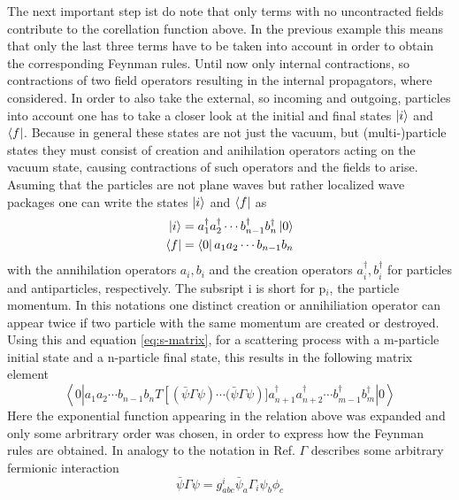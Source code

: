 The next important step ist do note that only terms with no uncontracted fields contribute to the corellation function above. In the previous example this means that only the last three terms have to be taken into account in order to obtain the corresponding Feynman rules. \newline
Until now only internal contractions, so contractions of two field operators resulting in the internal propagators, where considered. In order to also take the external, so incoming and outgoing, particles into account one has to take a closer look at the initial and final states $\ket{i}$ and $\bra{f}$. Because in general these states are not just the vacuum, but (multi-)particle states they must consist of creation and anihilation operators acting on the vacuum state, causing contractions of such operators and the fields to arise. Asuming that the particles are not plane waves but rather localized wave packages one can write the states $\ket{i}$ and $\bra{f}$ as\cite{Kopp:2016}
\begin{align*}
\ket{i}=a_1^\dagger a_2^\dagger \cdots b_{n-1}^\dagger b_n^\dagger \ket{0}
\\
\bra{f}=\bra{0}a_1 a_2 \cdots b_{n-1}b_n
\end{align*}
with the annihilation operators $a_i,b_i$ and the creation operators $a_i^\dagger,b_i^\dagger$ for particles and antiparticles, respectively. The subsript i is short for p$_i$, the particle momentum. In this notations one distinct creation or annihiliation operator can appear twice if two particle with the same momentum are created or destroyed. \newline
Using this and equation \ref{eq:s-matrix}, for a scattering process with a m-particle initial state and a n-particle final state, this results in the following matrix element \cite[Eq. 2.2]{Denner:1992vza}
\begin{equation}
\left<0\left|a_1 a_2 \cdots  b_{n-1} b_n T\left[\left(\bar{\psi}\Gamma\psi\right)\cdots(\bar{\psi}\Gamma\psi\right)]a_{n+1}^\dagger a_{n+2}^\dagger \cdots  b_{m-1}^\dagger b_m^\dagger\right|0\right>
\label{eq:matrix_element}
\end{equation}
Here the exponential function appearing in the relation above was expanded and only some arbritrary order was chosen, in order to express how the Feynman rules are obtained.\newline
In analogy to the notation in Ref.\cite{Denner:1992vza} $\Gamma$ describes some arbitrary fermionic interaction
\begin{equation*}
	\bar{\psi}\Gamma\psi=g^i_{abc}\bar{\psi}_a\Gamma_i\psi_b\phi_c
\end{equation*}
